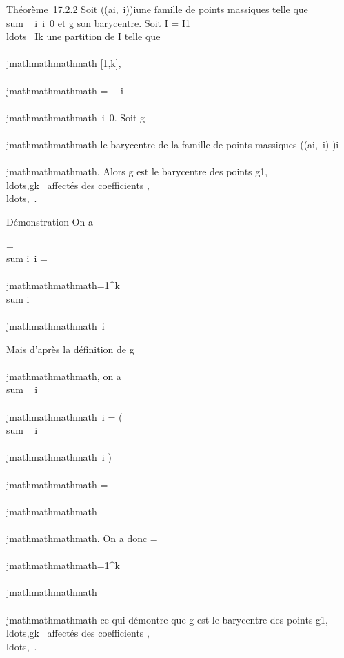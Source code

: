 Théorème~17.2.2 Soit \left
((ai,\lambda~i)\right )i\inI une
famille de points massiques telle que
\\sum ~
i\inI\lambda~i\neq~0 et g son
barycentre. Soit I = I1
\cup\\ldots~ \cup
Ik une partition de I telle que \forall~~\\\\jmathmathmathmath \in
{[}1,k{]}, \mu\\\\jmathmathmathmath =\
\sum ~
i\inI\\\\jmathmathmathmath\lambda~i\neq~0. Soit
g\\\\jmathmathmathmath le barycentre de la famille de points massiques
\left ((ai,\lambda~i)\right
)i\inI\\\\jmathmathmathmath. Alors g est le barycentre des points
g1,\\ldots,gk~
affectés des coefficients
,\\ldots,\muk~.

Démonstration On a

 = \\sum
i\inI\lambda~i\overrightarrowgai
= \sum \\\\jmathmathmathmath=1^k~
\\sum
i\inI\\\\jmathmathmathmath\lambda~i\overrightarrowgai

Mais d'après la définition de g\\\\jmathmathmathmath, on a
\\sum ~
i\inI\\\\jmathmathmathmath\lambda~i\overrightarrowgai
= \left
(\\sum ~
i\inI\\\\jmathmathmathmath\lambda~i\right
)\overrightarrowgg\\\\jmathmathmathmath =
\mu\\\\jmathmathmathmath\overrightarrowgg\\\\jmathmathmathmath. On a donc
\overrightarrow0 =\
\sum ~
\\\\jmathmathmathmath=1^k\mu\\\\jmathmathmathmath\overrightarrowgg\\\\jmathmathmathmath
ce qui démontre que g est le barycentre des points
g1,\\ldots,gk~
affectés des coefficients
,\\ldots,\muk~.

